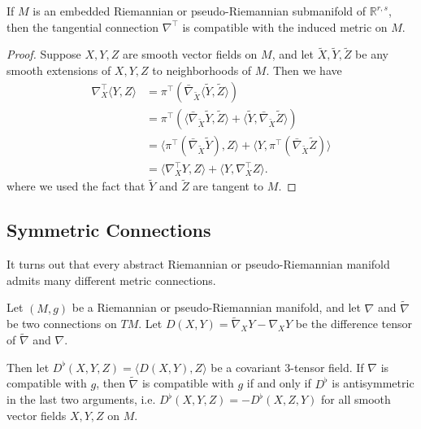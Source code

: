 \documentclass[../main.tex]{subfiles}
\begin{document}
\begin{proposition}{}{}
	If $M$ is an embedded Riemannian or pseudo-Riemannian submanifold of $\mathbb{R}^{r,s}$, then the tangential connection $\nabla^{\top}$ is compatible with the induced metric on $M$.
\end{proposition}
\begin{proof}
	Suppose $X, Y, Z$ are smooth vector fields on $M$, and let $\tilde{X}, \tilde{Y}, \tilde{Z}$ be any smooth extensions of $X, Y, Z$ to neighborhoods of $M$. Then we have
	\begin{equation*}
		\begin{aligned}
			\nabla^{\top}_X \langle Y, Z \rangle & = \pi^\top(\bar{\nabla}_{\tilde{X}} \langle \tilde{Y}, \tilde{Z} \rangle)                                                                 \\
			                                     & = \pi^\top(\langle \bar{\nabla}_{\tilde{X}} \tilde{Y}, \tilde{Z} \rangle + \langle \tilde{Y}, \bar{\nabla}_{\tilde{X}} \tilde{Z} \rangle) \\
			                                     & = \langle \pi^\top(\bar{\nabla}_{\tilde{X}} \tilde{Y}), Z \rangle + \langle Y, \pi^\top(\bar{\nabla}_{\tilde{X}} \tilde{Z}) \rangle       \\
			                                     & = \langle \nabla^{\top}_X Y, Z \rangle + \langle Y, \nabla^{\top}_X Z \rangle.
		\end{aligned}
	\end{equation*}
	where we used the fact that $\tilde{Y}$ and $\tilde{Z}$ are tangent to $M$.
\end{proof}

\subsection{Symmetric Connections}
It turns out that every abstract Riemannian or pseudo-Riemannian manifold admits many different metric connections.

\begin{proposition}{}{}
	Let $(M, g)$ be a Riemannian or pseudo-Riemannian manifold, and let $\nabla$ and $\tilde{\nabla}$ be two connections on $TM$. Let $D(X, Y) = \tilde{\nabla}_X Y - \nabla_X Y$ be the difference tensor of $\tilde{\nabla}$ and $\nabla$.

	Then let $D^{\flat}(X, Y, Z) = \langle D(X, Y), Z \rangle$ be a covariant 3-tensor field. If $\nabla$ is compatible with $g$, then $\tilde{\nabla}$ is compatible with $g$ if and only if $D^{\flat}$ is antisymmetric in the last two arguments, i.e. $D^{\flat}(X, Y, Z) = -D^{\flat}(X, Z, Y)$ for all smooth vector fields $X, Y, Z$ on $M$.
\end{proposition}
\end{document}
